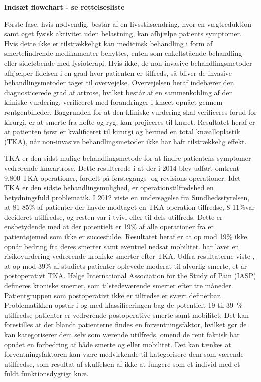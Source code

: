 \textbf{Indsæt flowchart - se rettelsesliste}

Første fase, hvis nødvendig, består af en livsstilsændring, hvor en vægtreduktion samt øget fysisk aktivitet uden belastning, kan afhjælpe patients symptomer. Hvis dette ikke er tilstrækkeligt kan medicinsk behandling i form af smertelindrende medikamenter benyttes, enten som enkeltstående behandling eller sideløbende med fysioterapi. Hvis ikke, de non-invasive behandlingsmetoder afhjælper lidelsen i en grad hvor patienten er tilfreds, så bliver de invasive behandlingsmetoder taget til overvejelse. Overvejelsen heraf indebærer den diagnosticerede grad af artrose, hvilket består af en sammenkobling af den kliniske vurdering, verificeret med forandringer i knæet opnået gennem røntgenbilleder. Baggrunden for at den kliniske vurdering skal verificeres forud for kirurgi, er at smerte fra hofte og ryg, kan projiceres til knæet. Resultatet heraf er at patienten først er kvalificeret til kirurgi og hermed en total knæalloplastik (TKA), når non-invasive behandlingsmetoder ikke har haft tilstrækkelig effekt. \citep{Lind2016b} \citep{brostrom2012}

TKA er den sidst mulige behandlingsmetode for at lindre patientens symptomer vedrørende knæartrose. Dette resulterede i at der i 2014 blev udført omtrent 9.800 TKA operationer, fordelt på førstegangs- og revisions operationer. \citep{aarsrapport2016} Idet TKA er den sidste behandlingsmulighed, er operationstilfredshed en betydningsfuld problematik. I 2012 viste en undersøgelse fra Sundhedsstyrelsen, at 81-85\% af patienter der havde modtaget en TKA operation tilfredse, 8-11\%var decideret utilfredse, og resten var i tvivl eller til dels utilfreds. Dette er ensbetydende med at der potentielt er 19\% af alle operationer fra et patientøjemed som ikke er succesfulde. Resultatet heraf er at op mod 19\% ikke opnår bedring fra deres smerter samt eventuel nedsat mobilitet. \citep{brostrom2012} \cite{Sakellariou2016} har lavet en risikovurdering vedrørende kroniske smerter efter TKA. Udfra resultaterne viste \cite{Sakellariou2016}, at op mod 39\% af studiets patienter oplevede moderat til alvorlig smerte, et år postoperativt TKA. Ifølge International Association for the Study of Pain (IASP) defineres kroniske smerter, som tilstedeværende smerter efter tre måneder. \citep{Sakellariou2016} \\
Patientgruppen som postoperativt ikke er tilfredse er svært definerbar. Problematikken opstår i og med klassificeringen bag de potentielt 19 til 39~\% utilfredse patienter er vedrørende postoperative smerte samt mobilitet. Det kan forestilles at der blandt patienterne findes en forventningsfaktor, hvilket gør de kan kategoriserer dem selv som værende utilfreds, omend de rent faktisk har opnået en forbedring af både smerte og eller mobilitet. Det kan tænkes at forventningsfaktoren kan være medvirkende til kategorisere dem som værende utilfredse, som resultat af skuffelsen af ikke at fungere som et individ med et fuldt funktionsdygtigt knæ.  

